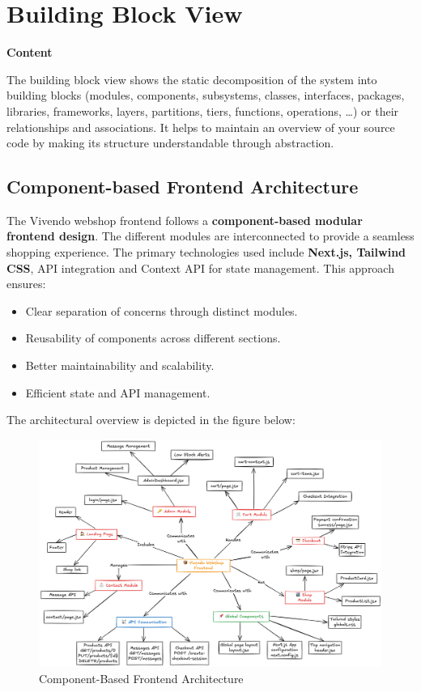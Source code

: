 \hypertarget{section-building-block-view}{%
\section{Building Block View}\label{section-building-block-view}}

\textbf{Content}

The building block view shows the static decomposition of the system into building blocks (modules, components, subsystems, classes, interfaces, packages, libraries, frameworks, layers, partitions, tiers, functions, operations, \ldots) or their relationships and associations. It helps to maintain an overview of your source code by making its structure understandable through abstraction.

\subsection{Component-based Frontend Architecture}
The Vivendo webshop frontend follows a \textbf{component-based modular frontend design}. The different modules are interconnected to provide a seamless shopping experience. The primary technologies used include \textbf{Next.js, Tailwind CSS}, API integration and Context API for state management. This approach ensures:
\begin{itemize}
    \item Clear separation of concerns through distinct modules.
    \item Reusability of components across different sections.
    \item Better maintainability and scalability.
    \item Efficient state and API management.
\end{itemize}
The architectural overview is depicted in the figure below:

\begin{figure}[h]
    \centering
    \includegraphics[width=\textwidth]{images/New_frontend_architecture.png}
    \caption{Component-Based Frontend Architecture}
    \label{fig:architecture}
\end{figure}

